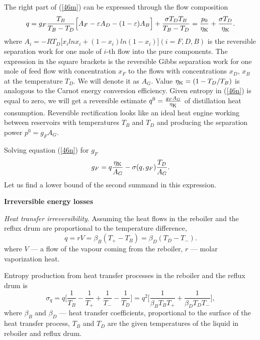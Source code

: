 \documentclass[12pt]{article}
\begin{document}
The right part of (\ref{46m}) can be expressed through the flow composition
\begin{equation}\label{46n}
q= g_{F}\frac{T_B}{T_B- T_D}\Big[ A_F-\varepsilon A_D-(1-\varepsilon)A_B\Big]+\frac{\sigma T_DT_B}{T_B- T_D}=\frac{p_0}{\eta_{{\mbox{\scriptsize K}}}}+ \frac{\sigma T_D}{\eta_{{\mbox{\scriptsize K}}}}.
\end{equation}
where $ A_i=-RT_D\Big[x_ilnx_i +(1-x_i)ln(1-x_i)\Big](i=F,D,B)$ is the reversible separation work for one mole of $i$-th flow into the pure components. The expression in the square brackets is the reversible Gibbs separation work for one mole of feed flow with concentration $x_F$ to the flows with concentrations $x_D$, $x_B$ at the temperature $T_D$. We will denote it as $A_G$. Value $\eta_{{\mbox{\scriptsize K}}}= (1- {T_D}/{T_B})$ is analogous to the Carnot energy conversion efficiency. Given entropy in (\ref{46n}) is equal to zero, we will get a reversible estimate $q^0=\frac{g_FA_G}{\eta_{{\mbox{\scriptsize K}}}}$ of distillation heat consumption. Reversible rectification looks like an ideal heat engine working between reservoirs with temperatures $T_B$ and $T_D$ and producing the separation power $p^0=g_F A_G$.

Solving  equation (\ref{46n}) for $g_F$
\begin{equation}\label{46n1}
g_F=q\frac{\eta_{{\mbox{\scriptsize K}}}}{A_G}-\sigma(q,g_F)\frac{T_D}{A_G}.
\end{equation}
Let us find a lower bound of the second summand in this expression.
 

\vspace*{0.3cm}
\textbf{Irreversible energy losses}

\textit{Heat transfer irreversibility}. Assuming the heat flows in the reboiler and the reflux drum are proportional to the temperature difference,
\begin{equation} 
q=rV=\beta_{B}(T_+-T_B)=\beta_{D}(T_D-T_-).
\label{q3a}
\end{equation}
where $V$ --- a flow of the vapour coming from the reboiler, $r$ --- molar vaporization heat.

Entropy production from heat transfer processes in the reboiler and the reflux drum is
\begin{equation}
\sigma_q = q\Big[\frac{1}{T_B}-\frac{1}{T_+}+\frac{1}{T_-}-\frac{1}{T_D} \Big]=q^2\Big[\frac{1}{\beta_{B}T_B T_{+}} +\frac{1}{\beta_{D}T_D T_{-}}\Big],
\label{q3}
\end{equation}
where $\beta_{B}$ and $\beta_{D}$ --- heat transfer coefficients, proportional to the surface of the heat transfer process, $T_B$ and $T_D$ are the given temperatures of the liquid in reboiler and reflux drum. 
\end{document}
